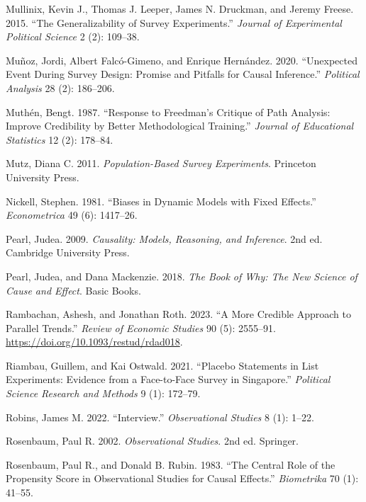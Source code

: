 \documentclass[
]{article}
\newlength{\cslhangindent}
\newenvironment{CSLReferences}[2] %
 {\begin{list}{}{%
  \setlength{\itemindent}{0pt}
  \setlength{\leftmargin}{0pt}
  \setlength{\parsep}{0pt}
  \ifodd #1
   \setlength{\leftmargin}{\cslhangindent}
   \setlength{\itemindent}{-1\cslhangindent}
  \fi
  \setlength{\itemsep}{#2\baselineskip}}}
 {\end{list}}
\begin{document}
\begin{CSLReferences}{1}{0}
Mullinix, Kevin J., Thomas J. Leeper, James N. Druckman, and Jeremy Freese. 2015. {``The Generalizability of Survey Experiments.''} \emph{Journal of Experimental Political Science} 2 (2): 109--38.

Muñoz, Jordi, Albert Falcó-Gimeno, and Enrique Hernández. 2020. {``Unexpected Event During Survey Design: Promise and Pitfalls for Causal Inference.''} \emph{Political Analysis} 28 (2): 186--206.

Muthén, Bengt. 1987. {``Response to {Freedman's} Critique of Path Analysis: Improve Credibility by Better Methodological Training.''} \emph{Journal of Educational Statistics} 12 (2): 178--84.

Mutz, Diana C. 2011. \emph{Population-Based Survey Experiments}. Princeton University Press.

Nickell, Stephen. 1981. {``Biases in Dynamic Models with Fixed Effects.''} \emph{Econometrica} 49 (6): 1417--26.

Pearl, Judea. 2009. \emph{Causality: Models, Reasoning, and Inference}. 2nd ed. Cambridge University Press.

Pearl, Judea, and Dana Mackenzie. 2018. \emph{The Book of Why: The New Science of Cause and Effect}. Basic Books.

Rambachan, Ashesh, and Jonathan Roth. 2023. {``A More Credible Approach to Parallel Trends.''} \emph{Review of Economic Studies} 90 (5): 2555--91. \url{https://doi.org/10.1093/restud/rdad018}.

Riambau, Guillem, and Kai Ostwald. 2021. {``Placebo Statements in List Experiments: Evidence from a Face-to-Face Survey in {Singapore}.''} \emph{Political Science Research and Methods} 9 (1): 172--79.

Robins, James M. 2022. {``Interview.''} \emph{Observational Studies} 8 (1): 1--22.

Rosenbaum, Paul R. 2002. \emph{Observational Studies}. 2nd ed. Springer.

Rosenbaum, Paul R., and Donald B. Rubin. 1983. {``The Central Role of the Propensity Score in Observational Studies for Causal Effects.''} \emph{Biometrika} 70 (1): 41--55.


\end{CSLReferences}
\end{document}

